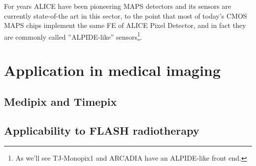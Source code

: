     For years ALICE have been pioneering MAPS detectors and its sensors are currently state-of-the art in this sector, to the point that most of today’s CMOS MAPS chips implement the same FE of ALICE Pixel Detector, and in fact they are commonly called ”ALPIDE-like” sensors\footnote{As we'll see TJ-Monopix1 and ARCADIA have an ALPIDE-like front end.}.
\section{Application in medical imaging}
    \subsection{Medipix and Timepix}
    \subsection{Applicability to FLASH radiotherapy}